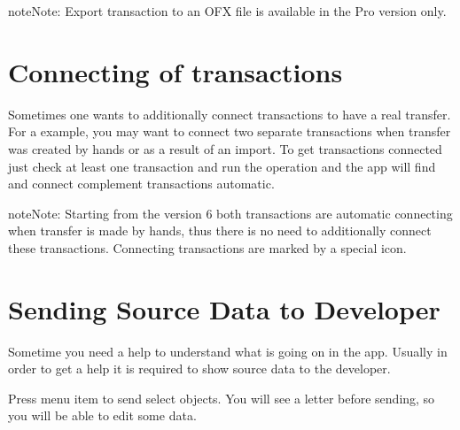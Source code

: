 \documentclass[a4paper,10pt,english]{sphinxmanual}
\begin{document}
\begin{sphinxadmonition}{note}{Note:}
Export transaction to an OFX file is available in the Pro version only.
\end{sphinxadmonition}

\noindent{}
\noindent{}
\noindent{}


\section{Connecting of transactions}
\label{\detokenize{bulk-actions:connecting-of-transactions}}
Sometimes one wants to additionally connect transactions to have a real transfer. For a
example, you may want to connect two separate transactions when transfer was created by hands or
as a result of an import. To get transactions connected just check at least one transaction and
run the operation and the app will find and connect complement transactions automatic.

\noindent{}

\begin{sphinxadmonition}{note}{Note:}
Starting from the version 6 both transactions are automatic connecting when transfer is
made by hands, thus there is no need to additionally connect these transactions. Connecting
transactions are marked by a special icon.
\end{sphinxadmonition}


\section{Sending Source Data to Developer}
\label{\detokenize{bulk-actions:sending-source-data-to-developer}}
Sometime you need a help to understand what is going on in the app. Usually in
order to get a help it is required to show source data to the developer.

Press  menu item to send select objects. You will
see a letter before sending, so you will be able to edit some data.

\noindent{}
\noindent{}
\end{document}
